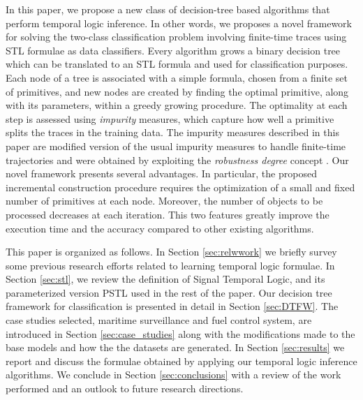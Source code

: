 In this paper, we propose a new class of decision-tree based algorithms that perform temporal logic inference. In other words, we proposes a novel framework for solving the two-class classification problem involving finite-time traces using STL formulae as data classifiers.
Every algorithm grows a binary decision tree which can be translated to an STL formula and used for classification purposes.
Each node of a tree is associated with a simple formula, chosen from a finite set of primitives, and new nodes are created by finding the optimal primitive, along with its parameters, within a greedy growing procedure. 
The optimality at each step is assessed using \emph{impurity} measures, which capture how well a primitive splits the traces in the training data.
The impurity measures described in this paper are modified version of the usual impurity measures to handle finite-time trajectories and were obtained by exploiting the \emph{robustness degree} concept \cite{donze_robust_2010}.
Our novel framework presents several advantages. In particular, the proposed incremental construction procedure requires the optimization of a small and fixed number of primitives at each node. Moreover, the number of objects to be processed decreases at each iteration. This two features greatly improve the execution time and the accuracy compared to other existing algorithms.

This paper is organized as follows. 
In Section \ref{sec:relwwork} we briefly survey some previous research efforts related to learning temporal logic formulae.
In Section \ref{sec:stl}, we review the definition of Signal Temporal Logic, and its parameterized version PSTL used in the rest of the paper.
Our decision tree framework for classification is presented in detail in Section \ref{sec:DTFW}.
The case studies selected, maritime surveillance and fuel control system, are introduced in Section \ref{sec:case_studies} along with the modifications made to the base models and how the the datasets are generated.
In Section \ref{sec:results} we report and discuss the formulae obtained by applying our temporal logic inference algorithms.
We conclude in Section \ref{sec:conclusions} with a review of the work performed and an outlook to future research directions.
